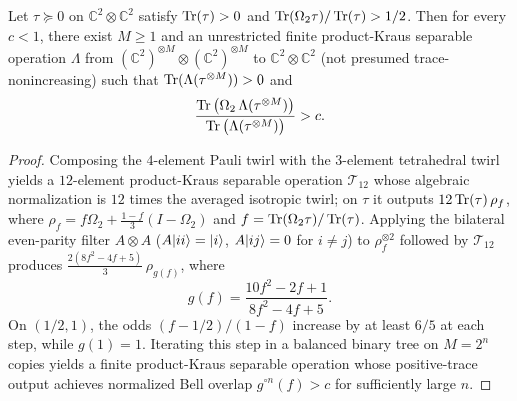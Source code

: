 \begin{lemma}
\label{lem:recurrence-amplification}
\leanok
{}
Let $\tau\succeq 0$ on $\mathbb{C}^2\otimes\mathbb{C}^2$ satisfy $\operatorname{Tr}(\tau) > 0$ and $\operatorname{Tr}(\Omega_2\tau)/\operatorname{Tr}(\tau) > 1/2$. Then for every $c < 1$, there exist $M\ge 1$ and an unrestricted finite product-Kraus separable operation $\Lambda$ from $(\mathbb{C}^2)^{\otimes M}\otimes(\mathbb{C}^2)^{\otimes M}$ to $\mathbb{C}^2\otimes\mathbb{C}^2$ (not presumed trace-nonincreasing) such that $\operatorname{Tr}(\Lambda(\tau^{\otimes M})) > 0$ and
\[
  \frac{\operatorname{Tr}\big(\Omega_2\,\Lambda(\tau^{\otimes M})\big)}{\operatorname{Tr}\big(\Lambda(\tau^{\otimes M})\big)} > c.
\]
\end{lemma}
\begin{proof}
\leanok
Composing the $4$-element Pauli twirl with the $3$-element tetrahedral twirl yields a $12$-element product-Kraus separable operation $\mathcal{T}_{12}$ whose algebraic normalization is $12$ times the averaged isotropic twirl; on $\tau$ it outputs $12\operatorname{Tr}(\tau)\,\rho_f$, where $\rho_f = f\Omega_2 + \frac{1-f}{3}(I - \Omega_2)$ and $f = \operatorname{Tr}(\Omega_2\tau)/\operatorname{Tr}(\tau)$. Applying the bilateral even-parity filter $A\otimes A$ ($A|ii\rangle=|i\rangle$, $A|ij\rangle=0$ for $i\neq j$) to $\rho_f^{\otimes 2}$ followed by $\mathcal{T}_{12}$ produces $\frac{2(8f^2-4f+5)}{3}\,\rho_{g(f)}$, where
\[
  g(f) = \frac{10f^2 - 2f + 1}{8f^2 - 4f + 5}.
\]
On $(1/2, 1)$, the odds $(f - 1/2)/(1 - f)$ increase by at least $6/5$ at each step, while $g(1) = 1$. Iterating this step in a balanced binary tree on $M = 2^n$ copies yields a finite product-Kraus separable operation whose positive-trace output achieves normalized Bell overlap $g^{\circ n}(f) > c$ for sufficiently large $n$.
\end{proof}

